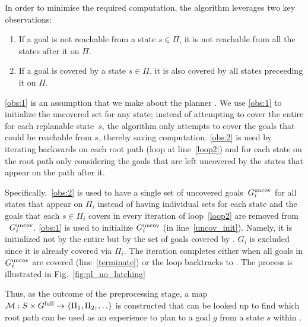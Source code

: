 \documentclass[a4paper]{report}
\begin{document}
In order to minimise the required computation, the algorithm leverages two key observations:

\begin{enumerate}[label={\textbf{O\arabic*}},leftmargin=0.75cm]
    \item \label{obs:1}
    If a goal is not reachable from a state $s \in \Pi$, it is not reachable from all the states after it on $\Pi$.
    \item \label{obs:2}
    If a goal is covered by a state $s \in \Pi$, it is also covered by all states preceeding it on $\Pi$.
\end{enumerate}

\ref{obs:1} is an assumption that we make about the planner \calP. We use \ref{obs:1} to initialize the uncovered set for any state; instead of attempting to cover the entire \Gfull for each replanable state~$s$, the algorithm only attempts to cover the goals that could be reachable from $s$, thereby saving computation.
%
\ref{obs:2} is used by iterating backwards on each root path (loop at line~\ref{loop2}) and for each state on the root path only considering the goals that are left uncovered by the states that appear on the path after it.

Specifically,~\ref{obs:2} is used to have a single set of uncovered goals~$G^{\textrm{uncov}}_i$ for all states that appear on $\Pi_i$ instead of having individual sets for each state and the goals that each $s \in \Pi_i$ covers in every iteration of loop~\ref{loop2} are removed from ~$G^{\textrm{uncov}}_i$.
%
\ref{obs:1} is used to initialize $G^{\textrm{uncov}}_i$ (in line~\ref{uncov_init}). Namely, it is initialized not by the entire \Gfull but by the set of goals covered by \Sstart. $G_i$ is excluded since it is already covered via $\Pi_i$. The iteration completes either when all goals in $G^{\textrm{uncov}}_i$ are covered (line~\ref{terminate}) or the loop backtracks to \Sstart.
The process is illustrated in Fig.~\ref{fig:pl_no_latching}

Thus, as the outcome of the preprocessing stage, a map $\mathcal{M}: S \times G^{\textrm{full}} \rightarrow \{ \Pi_1, \Pi_2, \ldots \}$ is constructed that can be looked up to find which root path can be used as an experience to plan to a goal $g$ from a state $s$ within \Tbound.
\end{document}
